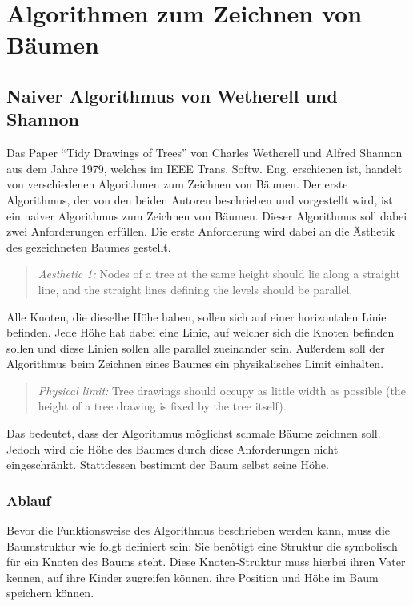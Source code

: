 \chapter{Algorithmen zum Zeichnen von Bäumen}
\label{chap:kapitel3}

\section{Naiver Algorithmus von Wetherell und Shannon}

Das Paper “Tidy Drawings of Trees” von Charles Wetherell und Alfred Shannon aus dem Jahre 1979, 
welches im IEEE Trans. Softw. Eng. erschienen ist, handelt von verschiedenen Algorithmen zum Zeichnen von Bäumen.
Der erste Algorithmus, der von den beiden Autoren beschrieben und vorgestellt wird, ist ein naiver Algorithmus 
zum Zeichnen von Bäumen. Dieser Algorithmus soll dabei zwei Anforderungen erfüllen. Die erste Anforderung wird dabei
an die Ästhetik des gezeichneten Baumes gestellt. 
\begin{quotation}
	\textit{Aesthetic 1:} Nodes of a tree at the same height should lie
	along a straight line, and the straight lines defining the levels
	should be parallel.\cite[]{q1}
\end{quotation}
Alle Knoten, die dieselbe Höhe haben, sollen sich auf einer horizontalen
Linie befinden. Jede Höhe hat dabei eine Linie, auf welcher sich die Knoten befinden sollen und diese Linien sollen alle
parallel zueinander sein. Außerdem soll der Algorithmus beim Zeichnen eines Baumes ein physikalisches Limit einhalten.
\begin{quotation}
	\textit{Physical limit:} Tree drawings should occupy as little width
	as possible (the height of a tree drawing is fixed by the tree
	itself).\cite[]{q1}
\end{quotation}
Das bedeutet, dass der Algorithmus möglichst schmale Bäume zeichnen soll. Jedoch wird die Höhe des Baumes durch diese Anforderungen
nicht eingeschränkt. Stattdessen bestimmt der Baum selbst seine Höhe. \cite[]{q1}

\label{chap:kapitel3_1_Ablauf}
\subsection{Ablauf}
Bevor die Funktionsweise des Algorithmus beschrieben werden kann, muss die Baumstruktur 
wie folgt definiert sein: Sie benötigt eine Struktur die symbolisch für ein Knoten des Baums steht. 
Diese Knoten-Struktur muss hierbei ihren Vater kennen, auf ihre Kinder zugreifen können, ihre Position und
Höhe im Baum speichern können.


